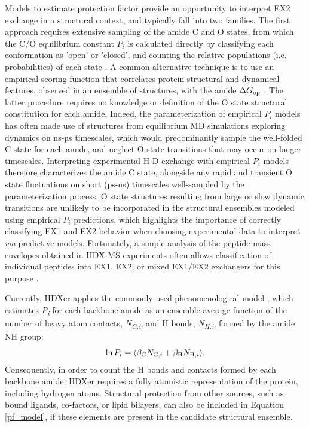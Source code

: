 \documentclass[9pt,tutorial]{livecoms}
\begin{document}
Models to estimate protection factor provide an opportunity to interpret EX2 exchange in a structural context, and typically fall into two families.
The first approach requires extensive sampling of the amide C and O states, from which the C/O equilibrium constant $P_i$ is calculated directly by classifying each conformation as 'open' or 'closed', and counting the relative populations (i.e. probabilities) of each state \cite{Persson2015, Liu2012}.
A common alternative technique is to use an empirical scoring function that correlates protein structural and dynamical features, observed in an ensemble of structures, with the amide $\Delta G_\textnormal{op}$ \cite{VendruscoloPaci2003, BestVendruscolo2006, Kieseritzky2006, Ma2011, Petruk2013, Park2015, Markwick2019}.
The latter procedure requires no knowledge or definition of the O state structural constitution for each amide. 
Indeed, the parameterization of empirical $P_i$ models has often made use of structures from equilibrium MD simulations exploring dynamics on ns-µs timescales, which would predominantly sample the well-folded C state for each amide, and neglect O-state transitions that may occur on longer timescales.
Interpreting experimental H-D exchange with empirical $P_i$ models therefore characterizes the amide C state, alongside any rapid and transient O state fluctuations on short (ps-ns) timescales well-sampled by the parameterization process.
O state structures resulting from large or slow dynamic transitions are unlikely to be incorporated in the structural ensembles modeled using empirical $P_i$ predictions, which highlights the importance of correctly classifying EX1 and EX2 behavior when choosing experimental data to interpret \textit{via} predictive models.
Fortunately, a simple analysis of the peptide mass envelopes obtained in HDX-MS experiments often allows classification of individual peptides into EX1, EX2, or mixed EX1/EX2 exchangers for this purpose \cite{Jensen2016, Ferraro2004, James2021}.

Currently, HDXer applies the commonly-used phenomenological model \cite{VendruscoloPaci2003, BestVendruscolo2006}, which estimates \textit{P\textsubscript{i}} for each backbone amide as an ensemble average function of the number of heavy atom contacts, \textit{N\textsubscript{C,i}}, and H bonds, \textit{N\textsubscript{H,i}}, formed by the amide NH group:
\begin{equation}\label{pf_model}
    \ln{P_i} = \langle \beta_\textnormal{C} N_{\textnormal{C},i} + \beta_\textnormal{H} N_{\textnormal{H},i} \rangle.
\end{equation}
Consequently, in order to count the H bonds and contacts formed by each backbone amide, HDXer requires a fully atomistic representation of the protein, including hydrogen atoms.
Structural protection from other sources, such as bound ligands, co-factors, or lipid bilayers, can also be included in Equation \ref{pf_model}, if these elements are present in the candidate structural ensemble.
\end{document}
